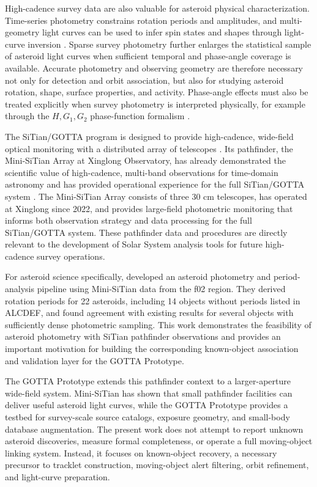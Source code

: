 \documentclass[referee]{raa}
\begin{document}
High-cadence survey data are also valuable for asteroid physical characterization. Time-series photometry constrains rotation periods and amplitudes, and multi-geometry light curves can be used to infer spin states and shapes through light-curve inversion \citep{Kaasalainen2001a,Kaasalainen2001b,Warner2009}. Sparse survey photometry further enlarges the statistical sample of asteroid light curves when sufficient temporal and phase-angle coverage is available. Accurate photometry and observing geometry are therefore necessary not only for detection and orbit association, but also for studying asteroid rotation, shape, surface properties, and activity. Phase-angle effects must also be treated explicitly when survey photometry is interpreted physically, for example through the $H,G_1,G_2$ phase-function formalism \citep{Muinonen2010}.

The SiTian/GOTTA program is designed to provide high-cadence, wide-field optical monitoring with a distributed array of telescopes \citep{Liu2021}. Its pathfinder, the Mini-SiTian Array at Xinglong Observatory, has already demonstrated the scientific value of high-cadence, multi-band observations for time-domain astronomy and has provided operational experience for the full SiTian/GOTTA system \citep{Huang2025MiniSitian,Han2025MiniSitianWhitePaper}. The Mini-SiTian Array consists of three 30 cm telescopes, has operated at Xinglong since 2022, and provides large-field photometric monitoring that informs both observation strategy and data processing for the full SiTian/GOTTA system. These pathfinder data and procedures are directly relevant to the development of Solar System analysis tools for future high-cadence survey operations.

For asteroid science specifically, \citet{LiuZhaoxing2025AsteroidLC} developed an asteroid photometry and period-analysis pipeline using Mini-SiTian data from the f02 region. They derived rotation periods for 22 asteroids, including 14 objects without periods listed in ALCDEF, and found agreement with existing results for several objects with sufficiently dense photometric sampling. This work demonstrates the feasibility of asteroid photometry with SiTian pathfinder observations and provides an important motivation for building the corresponding known-object association and validation layer for the GOTTA Prototype.

The GOTTA Prototype extends this pathfinder context to a larger-aperture wide-field system. Mini-SiTian has shown that small pathfinder facilities can deliver useful asteroid light curves, while the GOTTA Prototype provides a testbed for survey-scale source catalogs, exposure geometry, and small-body database augmentation. The present work does not attempt to report unknown asteroid discoveries, measure formal completeness, or operate a full moving-object linking system. Instead, it focuses on known-object recovery, a necessary precursor to tracklet construction, moving-object alert filtering, orbit refinement, and light-curve preparation.
\end{document}
